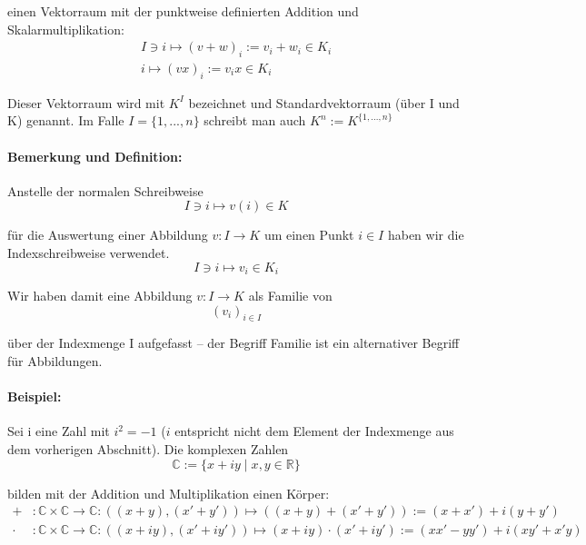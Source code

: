 	einen Vektorraum mit der punktweise definierten Addition und Skalarmultiplikation:
	\begin{gather*}
		I\ni i \mapsto (v+w)_i := v_i+w_i\in K_i\\
		i \mapsto (vx)_i := v_ix \in K_i
	\end{gather*}

	Dieser Vektorraum wird mit $K^{I}$ bezeichnet und Standardvektorraum (über I und K) genannt. Im Falle $ I=\{1,...,n\} $ schreibt man auch $K^{n} := K^{\{1,...,n\}}$

\paragraph{Bemerkung und Definition:}
	Anstelle der normalen Schreibweise
	\begin{equation*}
		I\ni i \mapsto v(i) \in K
	\end{equation*}

	für die Auswertung einer Abbildung  $v: I \to K$ um einen Punkt $i\in I$ haben wir die Indexschreibweise verwendet.
	\begin{equation*}
		I\ni i \mapsto v_i \in K_i
	\end{equation*}

	Wir haben damit eine Abbildung $v: I \to K$ als Familie von
	\begin{equation*}
		(v_i)_{i\in I}
	\end{equation*}

	über der Indexmenge I aufgefasst -- der Begriff Familie ist ein \glqq alternativer\grqq{} Begriff für Abbildungen.
	
\paragraph{Beispiel:}
	Sei i eine \glqq Zahl\grqq{} mit $i^2=-1$ ($i$ entspricht nicht dem Element der Indexmenge aus dem vorherigen Abschnitt). Die komplexen Zahlen
	\begin{equation*}
		\mathbb{C}:=\{{x+iy\mid x,y\in \mathbb{R}}\}
	\end{equation*}
 
	bilden mit der Addition und Multiplikation einen Körper:
	\begin{align*}
		+&:\mathbb{C}\times \mathbb{C} \to \mathbb{C}: ((x+y),(x'+y')) \mapsto ((x+y)+(x'+y')) := (x+x')+i(y+y')\\
		\cdot &:\mathbb{C}\times \mathbb{C} \to \mathbb{C}: ((x+iy),(x'+iy'))\mapsto (x+iy)\cdot (x'+iy') :=(xx'-yy')+i(xy'+x'y)
	\end{align*}

